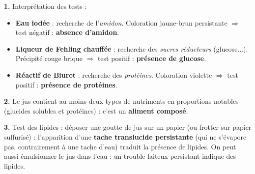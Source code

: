 \documentclass[11pt]{article}
\begin{document}
\begin{corrige}
\textbf{1.} Interprétation des tests :
\begin{itemize}
\item \textbf{Eau iodée} : recherche de l'\emph{amidon}. Coloration jaune-brun persistante $\Rightarrow$ test négatif : \textbf{absence d'amidon}.
\item \textbf{Liqueur de Fehling chauffée} : recherche des \emph{sucres réducteurs} (glucose...). Précipité rouge brique $\Rightarrow$ test positif : \textbf{présence de glucose}.
\item \textbf{Réactif de Biuret} : recherche des \emph{protéines}. Coloration violette $\Rightarrow$ test positif : \textbf{présence de protéines}.
\end{itemize}

\textbf{2.} Le jus contient au moins deux types de nutriments en proportions notables (glucides solubles et protéines) : c'est un \textbf{aliment composé}.

\textbf{3.} Test des lipides : déposer une goutte de jus sur un papier (ou frotter sur papier sulfurisé) : l'apparition d'une \textbf{tache translucide persistante} (qui ne s'évapore pas, contrairement à une tache d'eau) traduit la présence de lipides. On peut aussi émulsionner le jus dans l'eau : un trouble laiteux persistant indique des lipides.
\end{corrige}
\end{document}
